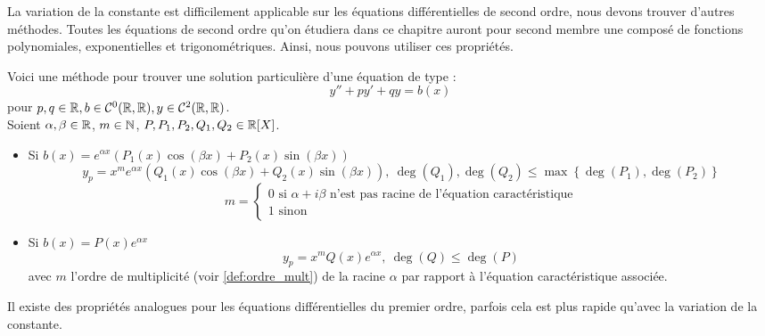 La variation de la constante est difficilement applicable sur les équations différentielles de second ordre, nous devons trouver d'autres méthodes.
Toutes les équations de second ordre qu'on étudiera dans ce chapitre auront pour second membre une composé de fonctions polynomiales, exponentielles et trigonométriques. Ainsi, nous pouvons utiliser ces propriétés.
\begin{proposition}
    Voici une méthode pour trouver une solution particulière d'une équation de type :
    \[ y'' + py' + qy = b(x) \]
    pour $p, q \in \mathbb{R}, b \in \mathcal{C}^0(\mathbb{R}, \mathbb{R}), y \in \mathcal{C}^2(\mathbb{R}, \mathbb{R})$. \\
    Soient $\alpha, \beta \in \mathbb{R}$, $m \in \mathbb{N}$, $P, P_1, P_2, Q_1, Q_2 \in \mathbb{R}[X]$. 
    \begin{itemize}
        \item \cite{exo7_analyse1} Si $b(x) = e^{\alpha x}(P_1(x) \cos(\beta x) + P_2(x) \sin(\beta x) )$
        \[y_{p} = x^{m} e^{\alpha x}(Q_1(x) \cos(\beta x) + Q_2(x) \sin(\beta x)) ,\ \deg(Q_1), \deg(Q_2) \leq \max\left\{ \deg(P_1), \deg(P_2) \right\} \]
        \[ m = \begin{cases}
            0 \text{ si } \alpha + i\beta \text{ n'est pas racine de l'équation caractéristique} \\
            1 \text{ sinon}
        \end{cases} \]
        \item Si $b(x) = P(x) e^{\alpha x}$ 
        \[ y_p = x^m Q(x)e^{\alpha x},\ \deg(Q) \leq \deg(P) \]
        avec $m$ l'ordre de multiplicité (voir \autoref{def:ordre_mult}) de la racine $\alpha$ par rapport à l'équation caractéristique associée.
    \end{itemize}
\end{proposition}

\begin{remark}
    Il existe des propriétés analogues pour les équations différentielles du premier ordre, parfois cela est plus rapide qu'avec la variation de la constante.
\end{remark}

